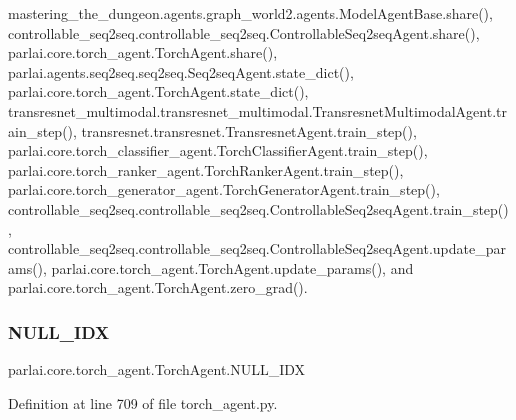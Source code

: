 mastering\+\_\+the\+\_\+dungeon.\+agents.\+graph\+\_\+world2.\+agents.\+Model\+Agent\+Base.\+share(), controllable\+\_\+seq2seq.\+controllable\+\_\+seq2seq.\+Controllable\+Seq2seq\+Agent.\+share(), parlai.\+core.\+torch\+\_\+agent.\+Torch\+Agent.\+share(), parlai.\+agents.\+seq2seq.\+seq2seq.\+Seq2seq\+Agent.\+state\+\_\+dict(), parlai.\+core.\+torch\+\_\+agent.\+Torch\+Agent.\+state\+\_\+dict(), transresnet\+\_\+multimodal.\+transresnet\+\_\+multimodal.\+Transresnet\+Multimodal\+Agent.\+train\+\_\+step(), transresnet.\+transresnet.\+Transresnet\+Agent.\+train\+\_\+step(), parlai.\+core.\+torch\+\_\+classifier\+\_\+agent.\+Torch\+Classifier\+Agent.\+train\+\_\+step(), parlai.\+core.\+torch\+\_\+ranker\+\_\+agent.\+Torch\+Ranker\+Agent.\+train\+\_\+step(), parlai.\+core.\+torch\+\_\+generator\+\_\+agent.\+Torch\+Generator\+Agent.\+train\+\_\+step(), controllable\+\_\+seq2seq.\+controllable\+\_\+seq2seq.\+Controllable\+Seq2seq\+Agent.\+train\+\_\+step(), controllable\+\_\+seq2seq.\+controllable\+\_\+seq2seq.\+Controllable\+Seq2seq\+Agent.\+update\+\_\+params(), parlai.\+core.\+torch\+\_\+agent.\+Torch\+Agent.\+update\+\_\+params(), and parlai.\+core.\+torch\+\_\+agent.\+Torch\+Agent.\+zero\+\_\+grad().

\mbox{\label{classparlai_1_1core_1_1torch__agent_1_1TorchAgent_a95cedd561757c9fc10dbf3a956e7f912}} 
\subsubsection{\texorpdfstring{N\+U\+L\+L\+\_\+\+I\+DX}{NULL\_IDX}}
{\footnotesize\ttfamily parlai.\+core.\+torch\+\_\+agent.\+Torch\+Agent.\+N\+U\+L\+L\+\_\+\+I\+DX}



Definition at line 709 of file torch\+\_\+agent.\+py.



